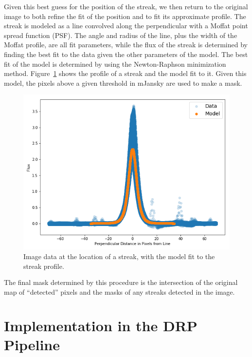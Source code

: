 \documentclass[DM,authoryear,toc]{lsstdoc}
\begin{document}
Given this best guess for the position of the streak, we then return to the original image to both refine the fit of the position and to fit its approximate profile. The streak is modeled as a line convolved along the perpendicular with a Moffat point spread function (PSF). The angle and radius of the line, plus the width of the Moffat profile, are all fit parameters, while the flux of the streak is determined by finding the best fit to the data given the other parameters of the model. The best fit of the model is determined by using the Newton-Raphson minimization method. Figure~\ref{fig: profile} shows the profile of a streak and the model fit to it. Given this model, the pixels above a given threshold in mJansky are used to make a mask.
\begin{figure}
\includegraphics[width=\columnwidth]{figures//HSC-R_visit23694_patch3,1_StreakFit.png}
\caption{Image data at the location of a streak, with the model fit to the streak profile.}
\label{fig: profile}
\end{figure}

The final mask determined by this procedure is the intersection of the original map of ``detected'' pixels and the masks of any streaks detected in the image.


\section{Implementation in the DRP Pipeline}
\label{sec: implementation}
\end{document}
